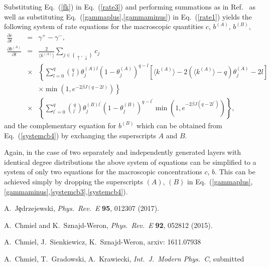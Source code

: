 \documentclass[11pt]{article}
\begin{document}
Substituting Eq.\ (\ref{fk}) in Eq.\ (\ref{rate3}) and performing summations as in Ref.\ \cite{Chmiel17a} as well as
substituting Eq.\ (\ref{gammaplus},\ref{gammaminus}) in Eq.\ (\ref{rate1}) yields the following system of rate
equations for the macroscopic quantities $c$, $b^{(A)}$, $b^{(B)}$,
\begin{eqnarray}
\frac{\partial c}{\partial t} &=&\gamma^{+}-\gamma^{-}, 
\label{systemcb3}\\
\frac{\partial b^{(A)}}{\partial t} &=& \frac{2}{\langle k^{(A)}\rangle} \sum_{j\in \left\{ \uparrow,\downarrow\right\}} c_{j} \nonumber\\
& \times&  \left\{ \sum_{l=0}^{q} {q \choose l } 
\theta_{j}^{(A)l}\left( 1-\theta_{j}^{(A)}\right)^{q-l}
\left[  \langle k^{(A)}\rangle -2 \left( \langle k^{(A)}\rangle -q\right) \theta_{j}^{(A)} -2l\right] \right. \nonumber\\
&& \left. \times \min \left(1, e^{ -2\beta J(q-2l)}\right)\right\} \nonumber\\
&\times& \left\{  \sum_{l^{\prime}=0}^{q} {q \choose l^{\prime}} 
\theta_{j}^{(B)l^{\prime}}\left( 1-\theta_{j}^{(B)}\right)^{q-l^{\prime}}
\min \left(1, e^{ -2\beta J(q-2l^{\prime})}\right)
\right\},
\label{systemcb4}
\end{eqnarray}
and the complementary equation for $b^{(B)}$ which can be obtained from Eq.\ (\ref{systemcb4}) by exchanging the 
superscripts $A$ and $B$.

Again, in the case of two separately and independently generated layers with identical degree distributions the
above system of equations can be simplified to a system of only two equations for the macroscopic 
concentrations $c$, $b$. This can be achieved simply by dropping the superscripts $(A)$, $(B)$ in 
Eq.\ (\ref{gammaplus},\ref{gammaminus},\ref{systemcb3},\ref{systemcb4}).

\newpage

\begin{thebibliography}{99}

A.\ J\c{e}drzejewski,
{\it Phys.\ Rev.\ E} {\bf 95}, 012307 (2017).

A.\ Chmiel and K.\ Sznajd-Weron,
{\it Phys.\ Rev.\ E} {\bf 92},  052812 (2015).

A.\ Chmiel, J.\ Sienkiewicz, K.\ Sznajd-Weron,
arxiv: 1611.07938

A.\ Chmiel, T.\ Gradowski, A.\ Krawiecki,
{\it Int.\ J.\ Modern Phys.\ C}, submitted

\end{thebibliography}
\end{document}
